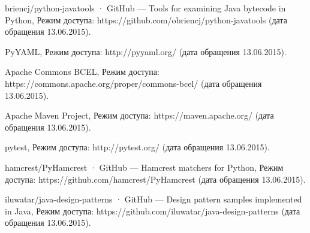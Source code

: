 \begin{thebibliography}{1}
\begin{flushleft}
briencj/python-javatools · GitHub --- Tools for examining Java bytecode in Python, Режим доступа: https://github.com/obriencj/python-javatools (дата обращения 13.06.2015).
\end{flushleft}

\begin{flushleft}
PyYAML, Режим доступа: http://pyyaml.org/ (дата обращения 13.06.2015).
\end{flushleft}

\begin{flushleft}
Apache Commons BCEL, Режим доступа: https://commons.apache.org/proper/commons-bcel/ (дата обращения 13.06.2015).
\end{flushleft}

\begin{flushleft}
Apache Maven Project, Режим доступа: https://maven.apache.org/ (дата обращения 13.06.2015).
\end{flushleft}

\begin{flushleft}
pytest, Режим доступа: http://pytest.org/ (дата обращения 13.06.2015).
\end{flushleft}

\begin{flushleft}
hamcrest/PyHamcrest · GitHub --- Hamcrest matchers for Python, Режим доступа: https://github.com/hamcrest/PyHamcrest (дата обращения 13.06.2015).
\end{flushleft}

\begin{flushleft}
iluwatar/java-design-patterns · GitHub --- Design pattern samples implemented in Java, Режим доступа: https://github.com/iluwatar/java-design-patterns (дата обращения 13.06.2015).
\end{flushleft}

\end{thebibliography}
